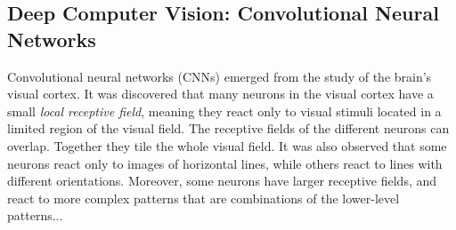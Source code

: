 

\subsection{Deep Computer Vision: Convolutional Neural Networks}

Convolutional neural networks (CNNs) emerged from the study of the brain's visual cortex.
It was discovered that many neurons in the visual cortex have a small \textit{local receptive field},
meaning they react only to visual stimuli located in a limited region of the visual field.
The receptive fields of the different neurons can overlap.
Together they tile the whole visual field.
It was also observed that some neurons react only to images of horizontal lines,
while others react to lines with different orientations.
Moreover, some neurons have larger receptive fields,
and react to more complex patterns that are combinations of the lower-level patterns...


